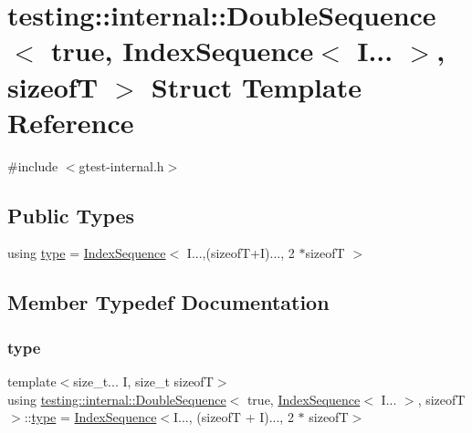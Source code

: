 \hypertarget{structtesting_1_1internal_1_1DoubleSequence_3_01true_00_01IndexSequence_3_01I_8_8_8_01_4_00_01sizeofT_01_4}{}\section{testing\+:\+:internal\+:\+:Double\+Sequence$<$ true, Index\+Sequence$<$ I... $>$, sizeofT $>$ Struct Template Reference}
\label{structtesting_1_1internal_1_1DoubleSequence_3_01true_00_01IndexSequence_3_01I_8_8_8_01_4_00_01sizeofT_01_4}


{\ttfamily \#include $<$gtest-\/internal.\+h$>$}

\subsection*{Public Types}
\begin{DoxyCompactItemize}
\item 
using \hyperlink{structtesting_1_1internal_1_1DoubleSequence_3_01true_00_01IndexSequence_3_01I_8_8_8_01_4_00_01sizeofT_01_4_a6f0fbcc14f5264c7db52f3ba3e264545}{type} = \hyperlink{structtesting_1_1internal_1_1IndexSequence}{Index\+Sequence}$<$ I...,(sizeofT+I)..., 2 $\ast$sizeofT $>$
\end{DoxyCompactItemize}


\subsection{Member Typedef Documentation}
\mbox{\label{structtesting_1_1internal_1_1DoubleSequence_3_01true_00_01IndexSequence_3_01I_8_8_8_01_4_00_01sizeofT_01_4_a6f0fbcc14f5264c7db52f3ba3e264545}} 
\subsubsection{\texorpdfstring{type}{type}}
{\footnotesize\ttfamily template$<$size\+\_\+t... I, size\+\_\+t sizeofT$>$ \\
using \hyperlink{structtesting_1_1internal_1_1DoubleSequence}{testing\+::internal\+::\+Double\+Sequence}$<$ true, \hyperlink{structtesting_1_1internal_1_1IndexSequence}{Index\+Sequence}$<$ I... $>$, sizeofT $>$\+::\hyperlink{structtesting_1_1internal_1_1DoubleSequence_3_01true_00_01IndexSequence_3_01I_8_8_8_01_4_00_01sizeofT_01_4_a6f0fbcc14f5264c7db52f3ba3e264545}{type} =  \hyperlink{structtesting_1_1internal_1_1IndexSequence}{Index\+Sequence}$<$I..., (sizeofT + I)..., 2 $\ast$ sizeofT$>$}



